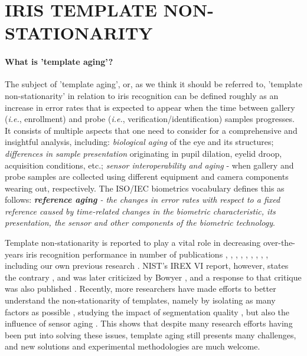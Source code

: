 \documentclass[a4paper,twoside]{article}
\begin{document}
\section{\uppercase{Iris template non-stationarity}}
\label{sec:Aging}

\paragraph{What is 'template aging'?}
The subject of 'template aging', or, as we think it should be referred to, 'template non-stationarity' in relation to iris recognition can be defined roughly as an increase in error rates that is expected to appear when the time between gallery (\emph{i.e.}, enrollment) and probe (\emph{i.e.}, verification/identification) samples progresses. It consists of multiple aspects that one need to consider for a comprehensive and insightful analysis, including: \emph{biological aging} of the eye and its structures; \emph{differences in sample presentation} originating in pupil dilation, eyelid droop, acquisition conditions, etc.; \emph{sensor interoperability and aging} - when gallery and probe samples are collected using different equipment and camera components wearing out, respectively. The ISO/IEC biometrics vocabulary defines this as follows: \emph{\textbf{reference aging} - the changes in error rates with respect to a fixed reference caused by time-related changes in the biometric characteristic, its presentation, the sensor and other components of the biometric technology}. 

Template non-stationarity is reported to play a vital role in decreasing over-the-years iris recognition performance in number of publications \cite{Gonzalez2008}, \cite{kevin2009factors}, \cite{Baker2009}, \cite{Baker2013}, \cite{Fenker2012}, \cite{Fenker2011}, \cite{FairhurstAging2011}, \cite{Sazonova}, \cite{BowyerOrtiz2015}, including our own previous research \cite{Czajka2013}. NIST's IREX VI report, however, states the contrary \cite{IREX6}, and was later criticized by Bowyer \cite{BowyerIREX}, and a response to that critique was also published \cite{Grother2015}. Recently, more researchers have made efforts to better understand the non-stationarity of templates, namely by isolating as many factors as possible \cite{HofbauerAging2016}, studying the impact of segmentation quality \cite{WildAging2015}, but also the influence of sensor aging \cite{AgingSensorIJCB14}. This shows that despite many research efforts having been put into solving these issues, template aging still presents many challenges, and new solutions and experimental methodologies are much welcome.  
\end{document}
